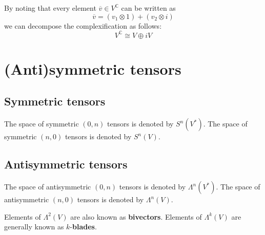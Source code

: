 	\begin{property}
		By noting that every element $\overline{v}\in V^{\mathbb{C}}$ can be written as \[\overline{v} = (v_1\otimes1) + (v_2\otimes i)\] we can decompose the complexification as follows:
		\begin{equation}
			V^{\mathbb{C}} \cong V\oplus iV
		\end{equation}
	\end{property}

\section{(Anti)symmetric tensors}
\subsection{Symmetric tensors}

	\begin{notation}
		The space of symmetric $(0,n)$ tensors is denoted by $S^n(V^*)$. The space of symmetric $(n, 0)$ tensors is denoted by $S^n(V)$.
	\end{notation}
    
\subsection{Antisymmetric tensors}
	\begin{notation}
		\label{tensor:not:antysimmetric_space}
		The space of antisymmetric $(0,n)$ tensors is denoted by $\Lambda^n(V^*)$. The space of antisymmetric $(n, 0)$ tensors is denoted by $\Lambda^n(V)$.
	\end{notation}
    \begin{remark*}
    	Elements of $\Lambda^2(V)$ are also known as \textbf{bivectors}. Elements of $\Lambda^k(V)$ are generally known as $k$-\textbf{blades}.
    \end{remark*}
    
